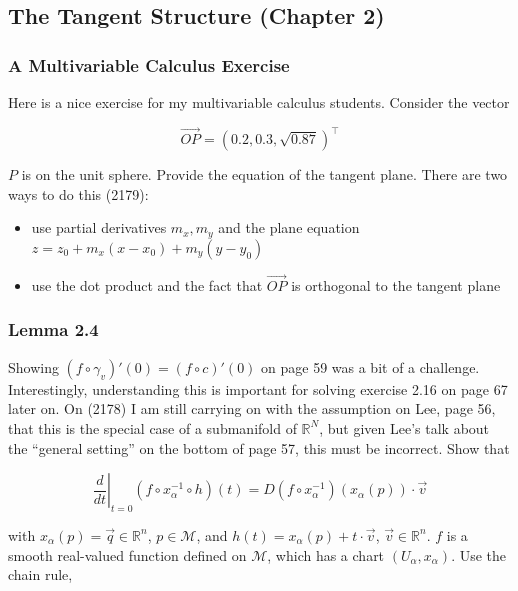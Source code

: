 \documentclass[12pt]{article}
\begin{document}
\subsection{The Tangent Structure (Chapter 2)}
\label{subsection:woochong}

\subsubsection{A Multivariable Calculus Exercise}
\label{subsubsection:edohmien}

Here is a nice exercise for my multivariable calculus students.
Consider the vector

\begin{equation}
  \label{eq:egaiyeih}
  \vec{OP}=(0.2,0.3,\sqrt{0.87})^{\intercal}
\end{equation}

$P$ is on the unit sphere. Provide the equation of the tangent plane.
There are two ways to do this (2179):

\begin{itemize}
\item use partial derivatives $m_{x},m_{y}$ and the plane equation
  $z=z_{0}+m_{x}(x-x_{0})+m_{y}(y-y_{0})$
\item use the dot product and the fact that $\vec{OP}$ is orthogonal
  to the tangent plane
\end{itemize}

\subsubsection{Lemma 2.4}
\label{subsubsection:fiezothu}

Showing $(f\circ\gamma_{v})'(0)=(f\circ{}c)'(0)$ on page 59 was a bit
of a challenge. Interestingly, understanding this is important for
solving exercise 2.16 on page 67 later on. On (2178) I am still
carrying on with the assumption on Lee, page 56, that this is the
special case of a submanifold of $\mathbb{R}^{N}$, but given Lee's
talk about the ``general setting'' on the bottom of page 57, this must
be incorrect. Show that

\begin{equation}
  \label{eq:chaequah}
  \left.\frac{d}{dt}\right\vert_{t=0}(f\circ{}x_{\alpha}^{-1}\circ{}h)(t)=D(f\circ{}x_{\alpha}^{-1})(x_{\alpha}(p))\cdot\vec{v}
\end{equation}

with $x_{\alpha}(p)=\vec{q}\in\mathbb{R}^{n}$, $p\in\mathcal{M}$, and
$h(t)=x_{\alpha}(p)+t\cdot\vec{v}$, $\vec{v}\in\mathbb{R}^{n}$. $f$ is
a smooth real-valued function defined on $\mathcal{M}$, which has a
chart $(U_{\alpha},x_{\alpha})$. Use the chain rule,
\end{document}
